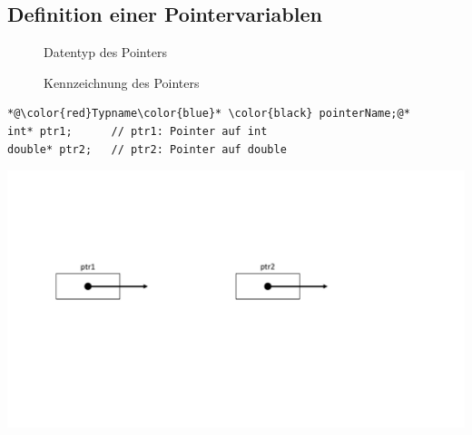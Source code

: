 \subsection{Definition einer Pointervariablen}
\begin{description}
	\item[\color{red}{Typname}] Datentyp des Pointers
	\item[\color{blue}{*}] Kennzeichnung des Pointers
\end{description}
\noindent
\begin{minipage}{0.5\linewidth}
\begin{lstlisting}
*@\color{red}Typname\color{blue}* \color{black} pointerName;@*
int* ptr1;		// ptr1: Pointer auf int
double* ptr2;	// ptr2: Pointer auf double
\end{lstlisting}
\end{minipage}
\hspace{0.01\linewidth}
\begin{minipage}{0.5\linewidth}
	\includegraphics[width=\linewidth]{images/pointer2.pdf}
\end{minipage}

